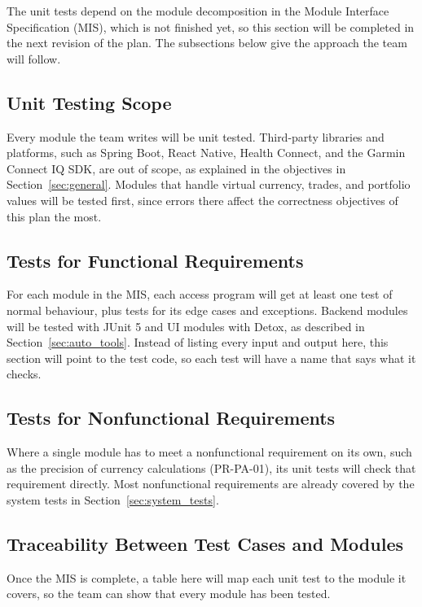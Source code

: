 \documentclass[12pt, titlepage]{article}
\begin{document}
The unit tests depend on the module decomposition in the Module Interface
Specification (MIS), which is not finished yet, so this section will be
completed in the next revision of the plan. The subsections below give the
approach the team will follow.

\subsection{Unit Testing Scope}

Every module the team writes will be unit tested. Third-party libraries and
platforms, such as Spring Boot, React Native, Health Connect, and the Garmin
Connect IQ SDK, are out of scope, as explained in the objectives in
Section~\ref{sec:general}. Modules that handle virtual currency, trades, and
portfolio values will be tested first, since errors there affect the
correctness objectives of this plan the most. 

\subsection{Tests for Functional Requirements}

For each module in the MIS, each access program will get at least one test of
normal behaviour, plus tests for its edge cases and exceptions. Backend modules
will be tested with JUnit 5 and UI modules with Detox, as described in
Section~\ref{sec:auto_tools}. Instead of listing every input and output here,
this section will point to the test code, so each test will have a name that
says what it checks.

\subsection{Tests for Nonfunctional Requirements}

Where a single module has to meet a nonfunctional requirement on its own, such
as the precision of currency calculations (PR-PA-01), its unit tests will check
that requirement directly. Most nonfunctional requirements are already covered
by the system tests in Section~\ref{sec:system_tests}.

\subsection{Traceability Between Test Cases and Modules}

Once the MIS is complete, a table here will map each unit test to the module it
covers, so the team can show that every module has been tested.
\end{document}
